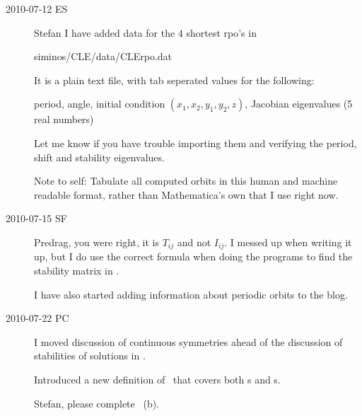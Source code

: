 \begin{description}
\item[2010-07-12 ES] Stefan I have added data for the $4$ shortest rpo's
in

siminos/CLE/data/CLErpo.dat

It is a plain text file, with tab seperated values for the following:

period, angle, initial condition $(x_1,x_2,y_1,y_2,z)$, Jacobian eigenvalues (5 real numbers)

Let me know if you have trouble importing them and verifying
the period, shift and stability eigenvalues.

Note to self: Tabulate all computed orbits in this human and machine readable format,
rather than Mathematica's own that I use right now.

\item[2010-07-15 SF]
Predrag, you were right, it is $T_{ij}$ and not $I_{ij}$. I
messed up when writing it up, but I do use the correct
formula when doing the programs to find the stability matrix
in \reducedsp.

I have also started adding information about periodic orbits to the blog.

\item[2010-07-22 PC] I moved discussion of continuous symmetries ahead of
the discussion of stabilities of solutions in .

Introduced a new definition  of \FloquetM\ that covers
both \po s and \rpo s.

Stefan, please complete ~(b).

\end{description}
